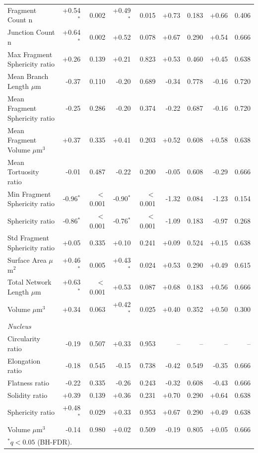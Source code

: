 \documentclass[11pt,a4paper]{article}
\begin{document}
\begin{longtable}{lrrrrrrrr}
  Fragment Count n & +0.54$^{*}$ & 0.002 & +0.49$^{*}$ & 0.015 & +0.73 & 0.183 & +0.66 & 0.406 \\
  Junction Count n & +0.64$^{*}$ & 0.002 & +0.52 & 0.078 & +0.67 & 0.290 & +0.54 & 0.666 \\
  Max Fragment Sphericity ratio & +0.26 & 0.139 & +0.21 & 0.823 & +0.53 & 0.460 & +0.45 & 0.638 \\
  Mean Branch Length $\mu$m & -0.37 & 0.110 & -0.20 & 0.689 & -0.34 & 0.778 & -0.16 & 0.720 \\
  Mean Fragment Sphericity ratio & -0.25 & 0.286 & -0.20 & 0.374 & -0.22 & 0.687 & -0.16 & 0.720 \\
  Mean Fragment Volume $\mu$m$^{3}$ & +0.37 & 0.335 & +0.41 & 0.203 & +0.52 & 0.608 & +0.58 & 0.638 \\
  Mean Tortuosity ratio & -0.01 & 0.487 & -0.22 & 0.200 & -0.05 & 0.608 & -0.29 & 0.666 \\
  Min Fragment Sphericity ratio & -0.96$^{*}$ & $<$0.001 & -0.90$^{*}$ & $<$0.001 & -1.32 & 0.084 & -1.23 & 0.154 \\
  Sphericity ratio & -0.86$^{*}$ & $<$0.001 & -0.76$^{*}$ & $<$0.001 & -1.09 & 0.183 & -0.97 & 0.268 \\
  Std Fragment Sphericity ratio & +0.05 & 0.335 & +0.10 & 0.241 & +0.09 & 0.524 & +0.15 & 0.638 \\
  Surface Area $\mu$m$^{2}$ & +0.46$^{*}$ & 0.005 & +0.43$^{*}$ & 0.024 & +0.53 & 0.290 & +0.49 & 0.615 \\
  Total Network Length $\mu$m & +0.63$^{*}$ & $<$0.001 & +0.53 & 0.087 & +0.68 & 0.183 & +0.56 & 0.666 \\
  Volume $\mu$m$^{3}$ & +0.34 & 0.063 & +0.42$^{*}$ & 0.025 & +0.40 & 0.352 & +0.50 & 0.300 \\
\midrule
\multicolumn{9}{l}{\textit{Nucleus}} \\
  Circularity ratio & -0.19 & 0.507 & +0.33 & 0.953 & -- & -- & -- & -- \\
  Elongation ratio & -0.18 & 0.545 & -0.15 & 0.738 & -0.42 & 0.549 & -0.35 & 0.666 \\
  Flatness ratio & -0.22 & 0.335 & -0.26 & 0.243 & -0.32 & 0.608 & -0.43 & 0.666 \\
  Solidity ratio & +0.39 & 0.139 & +0.36 & 0.231 & +0.70 & 0.290 & +0.64 & 0.638 \\
  Sphericity ratio & +0.48$^{*}$ & 0.029 & +0.33 & 0.953 & +0.67 & 0.290 & +0.49 & 0.638 \\
  Volume $\mu$m$^{3}$ & -0.14 & 0.980 & +0.02 & 0.509 & -0.19 & 0.805 & +0.05 & 0.666 \\
\bottomrule
\multicolumn{9}{l}{\footnotesize $^{*}q < 0.05$ (BH-FDR).} \\
\end{longtable}
\end{document}
